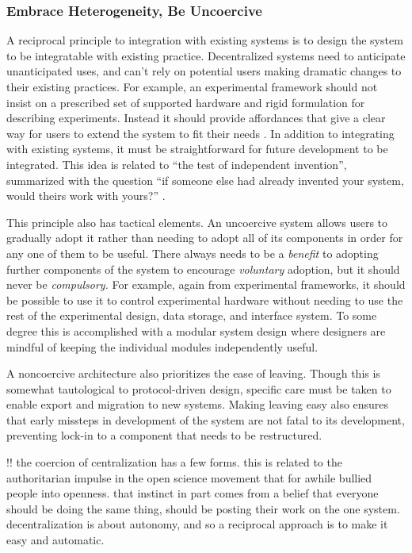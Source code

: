 \documentclass[10pt]{article}
\begin{document}
\begin{multicols}{2}
\hypertarget{embrace-heterogeneity-be-uncoercive}{%
\subsubsection{Embrace Heterogeneity, Be
Uncoercive}\label{embrace-heterogeneity-be-uncoercive}}

A reciprocal principle to integration with existing systems is to design
the system to be integratable with existing practice. Decentralized
systems need to anticipate unanticipated uses, and can't rely on
potential users making dramatic changes to their existing practices. For
example, an experimental framework should not insist on a prescribed set
of supported hardware and rigid formulation for describing experiments.
Instead it should provide affordances that give a clear way for users to
extend the system to fit their needs \cite{carpenterRFC1958Architectural1996} . In addition to integrating with
existing systems, it must be straightforward for future development to
be integrated. This idea is related to ``the test of independent
invention'', summarized with the question ``if someone else had already
invented your system, would theirs work with yours?'' \cite{berners-leePrinciplesDesign1998} .

This principle also has tactical elements. An uncoercive system allows
users to gradually adopt it rather than needing to adopt all of its
components in order for any one of them to be useful. There always needs
to be a \emph{benefit} to adopting further components of the system to
encourage \emph{voluntary} adoption, but it should never be
\emph{compulsory.} For example, again from experimental frameworks, it
should be possible to use it to control experimental hardware without
needing to use the rest of the experimental design, data storage, and
interface system. To some degree this is accomplished with a modular
system design where designers are mindful of keeping the individual
modules independently useful.

A noncoercive architecture also prioritizes the ease of leaving. Though
this is somewhat tautological to protocol-driven design, specific care
must be taken to enable export and migration to new systems. Making
leaving easy also ensures that early missteps in development of the
system are not fatal to its development, preventing lock-in to a
component that needs to be restructured.

!! the coercion of centralization has a few forms. this is related to
the authoritarian impulse in the open science movement that for awhile
bullied people into openness. that instinct in part comes from a belief
that everyone should be doing the same thing, should be posting their
work on the one system. decentralization is about autonomy, and so a
reciprocal approach is to make it easy and automatic.


\end{multicols}
\end{document}
